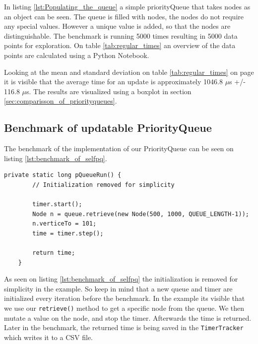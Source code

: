 \documentclass{article}
\begin{document}
In listing \ref{lst:Populating_the_queue} a simple priorityQueue that takes nodes as an object can be seen. 
The queue is filled with nodes, the nodes do not require any special values. However a unique 
value is added, so that the nodes are distinguishable.
The benchmark is running 5000 times resulting in 5000 data points for exploration. 
On table \ref{tab:regular_times} an overview of the data points are calculated using a Python Notebook.

Looking at the mean and standard deviation on table \ref{tab:regular_times} on page \pageref{tab:regular_times} it is 
visible that the average time for an update is approximately 1046.8 $\mu$s +/- 116.8 $\mu$s. 
The results are visualized using a boxplot in section \ref{sec:comparisson_of_priorityqueues}.





\subsection{Benchmark of updatable PriorityQueue} %
The benchmark of the implementation of our PriorityQueue can be seen on 
listing \ref{lst:benchmark_of_selfpq}.

\begin{lstlisting}[caption={Benchmark implmentation on our PriorityQueue},label={lst:benchmark_of_selfpq}]
    private static long pQueueRun() {
        // Initialization removed for simplicity

        timer.start();
        Node n = queue.retrieve(new Node(500, 1000, QUEUE_LENGTH-1));
        n.verticeTo = 101;
        time = timer.step();

        return time;
    }
\end{lstlisting}

As seen on listing \ref{lst:benchmark_of_selfpq} the initialization is removed for simplicity in the example. 
So keep in mind that a new queue and timer are initialized every iteration before the benchmark. 
In the example its visible that we use our \lstinline{retrieve()} method to get a specific 
node from the queue. We then mutate a value on the node, and stop the timer. 
Afterwards the time is returned. Later in the benchmark, the returned time is being saved in the
\lstinline{TimerTracker} which writes it to a CSV file. 
\end{document}
